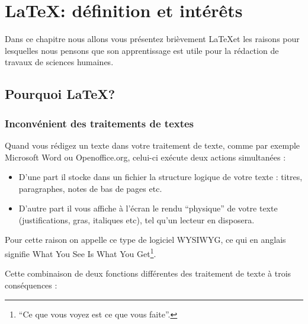 \chapter{\LaTeX : définition et intérêts}

\begin{prealable}
 Dans ce chapitre nous allons vous présentez brièvement \LaTeX et les raisons pour lesquelles nous pensons que son apprentissage est utile pour la rédaction de travaux de sciences humaines.
\end{prealable}

\section{Pourquoi \LaTeX ?}

\subsection{Inconvénient des traitements de textes}

Quand vous rédigez un texte dans votre traitement de texte, comme par exemple Microsoft Word ou Openoffice.org, celui-ci exécute deux actions simultanées :

\begin{itemize}
\item D'une part il stocke dans un fichier la structure logique de votre texte : titres, paragraphes, notes de bas de pages etc.
\item D'autre part il vous affiche à l'écran le rendu \enquote{physique} de votre texte (justifications, gras, italiques etc), tel qu'un lecteur en disposera.
\end{itemize}

Pour cette raison on appelle ce type de logiciel WYSIWYG, ce qui en anglais signifie \textenglish{What You See Is What You Get}\footnote{\enquote{Ce que vous voyez est ce que vous faite}.}. 

Cette combinaison de deux fonctions différentes des traitement de texte à trois conséquences :

